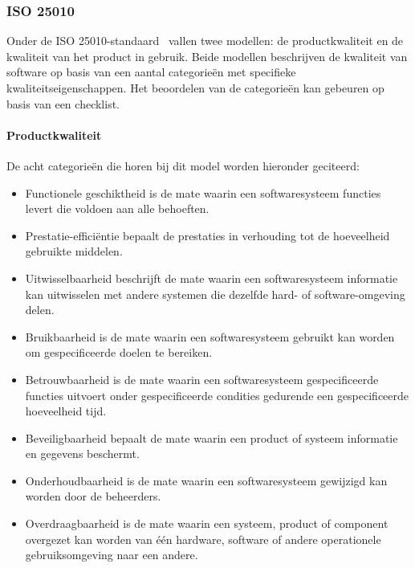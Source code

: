 \subsubsection{ISO 25010}
\label{sec:vergelijken-iso}
Onder de ISO 25010-standaard~\cite{Standard2010} vallen twee modellen:  de productkwaliteit en de kwaliteit van het product in gebruik.  
Beide modellen beschrijven de kwaliteit van software op basis van een aantal categorieën met specifieke kwaliteitseigenschappen. 
Het beoordelen van de categorieën kan gebeuren op basis van een checklist. 
 
\paragraph{Productkwaliteit}
De acht categorieën die horen bij dit model worden hieronder geciteerd:
\begin{itemize}
 \item Functionele geschiktheid is de mate waarin een softwaresysteem functies levert die voldoen aan alle behoeften. 
 \item Prestatie-efficiëntie bepaalt de prestaties in verhouding tot de hoeveelheid gebruikte middelen.
 \item Uitwisselbaarheid beschrijft de mate waarin een softwaresysteem informatie kan uitwisselen met andere systemen die dezelfde hard- of software-omgeving delen.
 \item Bruikbaarheid is de mate waarin een softwaresysteem gebruikt kan worden om gespecificeerde doelen te bereiken.
 \item Betrouwbaarheid is de mate waarin een softwaresysteem gespecificeerde functies uitvoert onder gespecificeerde condities gedurende een gespecificeerde hoeveelheid tijd.
 \item Beveiligbaarheid bepaalt de mate waarin een product of systeem informatie en gegevens beschermt.
 \item Onderhoudbaarheid is de mate waarin een softwaresysteem gewijzigd kan worden door de beheerders.
 \item Overdraagbaarheid is de mate waarin een systeem, product of component overgezet kan worden van één hardware, software of andere operationele gebruiksomgeving naar een andere.
\end{itemize}

